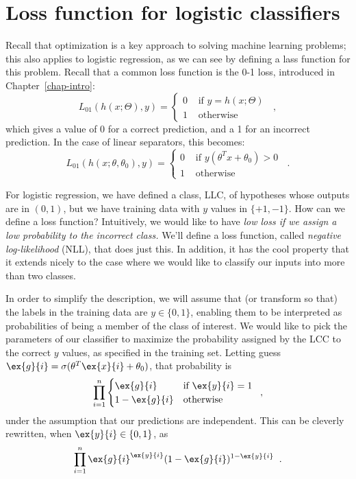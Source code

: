 \section{Loss function for logistic classifiers}

\label{logistic}
Recall that optimization is a key approach to solving machine learning
problems; this also applies to logistic regression, as we can see by
defining a lass function for this problem.  Recall that a common loss function
is the 0-1 loss, introduced in Chapter~\ref{chap-intro}:
\[ L_{01}(h(x; \Theta), y) =
  \begin{cases}
    0 & \text{ if } y = h(x; \Theta)\\
    1 & \text{ otherwise}
  \end{cases}\;\;,
\]
which gives a value of 0 for a correct prediction, and a 1 for an
incorrect prediction.  In the case of linear separators, this becomes:
\[ L_{01}(h(x;\theta, \theta_0), y) =
  \begin{cases}
    0 & \text{ if } y(\theta^Tx + \theta_0) > 0 \\
    1 & \text{ otherwise}
  \end{cases}\;\;.
\]


%
For logistic regression, we have defined a class, LLC, of hypotheses whose outputs are in $(0, 1)$, 
but we have training data with $y$ values  in $\{+1, -1\}$.  How
can we define a loss function?  Intuitively, we would like to have
{\em low loss if we assign a low probability to the incorrect class.}
We'll define a loss function, called {\em negative log-likelihood} (NLL),
that does just this.  In  addition, it has the cool property that it
extends nicely to the case where we would like to classify our inputs
into more than two classes.

In order to simplify the description, we will assume that (or transform so that) the labels
in the training data are $y \in \{0, 1\}$, enabling them to be
interpreted as probabilities of being a member of the class of
interest.  
We would like to pick the parameters of our classifier to maximize the
probability assigned by the LCC to the correct $y$ values, as
specified in the training set.  Letting guess $\ex{g}{i} =
\sigma(\theta^T\ex{x}{i} + \theta_0)$, 
that probability is
\begin{equation*}
 \prod_{i = 1}^n \begin{cases} \ex{g}{i} & \text{if $\ex{y}{i} =
    1$}  \\ 1 - \ex{g}{i} & \text{otherwise}
\end{cases}\;\;,
\end{equation*}
under the assumption that our predictions are independent.  This can
be cleverly rewritten, when $\ex{y}{i} \in \{0, 1\}$, as
\begin{equation*}
 \prod_{i = 1}^n {\ex{g}{i}}^{\ex{y}{i}}(1 - \ex{g}{i})^{1 - \ex{y}{i}}\;\;.
\end{equation*}

